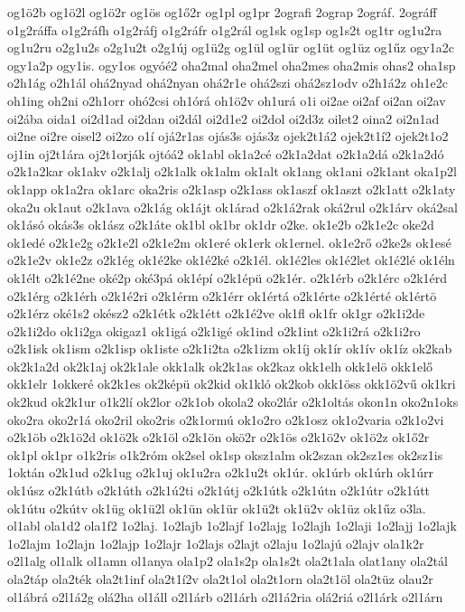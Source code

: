 {og1ö2b
og1ö2l
og1ö2r
og1ös
og1ő2r
og1pl
og1pr
2ografi
2ograp
2ográf.
2ográff
o1g2ráffa
o1g2ráfh
o1g2ráfj
o1g2ráfr
o1g2rál
og1sk
og1sp
og1s2t
og1tr
og1u2ra
og1u2ru
o2g1u2s
o2g1u2t
o2g1új
og1ü2g
og1ül
og1ür
og1üt
og1üz
og1űz
ogy1a2c
ogy1a2p
ogy1is.
ogy1os
ogyóé2
oha2mal
oha2mel
oha2mes
oha2mis
ohas2
oha1sp
o2h1ág
o2h1ál
ohá2nyad
ohá2nyan
ohá2r1e
ohá2szi
ohá2sz1odv
o2h1á2z
oh1e2c
oh1ing
oh2ni
o2h1orr
ohó2csi
oh1órá
oh1ö2v
oh1urá
o1i
oi2ae
oi2af
oi2an
oi2av
oi2ába
oida1
oi2d1ad
oi2dan
oi2dál
oi2d1e2
oi2dol
oi2d3z
oilet2
oina2
oi2n1ad
oi2ne
oi2re
oisel2
oi2zo
o1í
ojá2r1as
ojás3s
ojás3z
ojek2t1á2
ojek2t1í2
ojek2t1o2
oj1in
oj2t1ára
oj2t1orják
ojtóá2
ok1abl
ok1a2cé
o2k1a2dat
o2k1a2dá
o2k1a2dó
o2k1a2kar
ok1akv
o2k1alj
o2k1alk
ok1alm
ok1alt
ok1ang
ok1ani
o2k1ant
oka1p2l
ok1app
ok1a2ra
ok1arc
oka2ris
o2k1asp
o2k1ass
ok1aszf
ok1aszt
o2k1att
o2k1aty
oka2u
ok1aut
o2k1ava
o2k1ág
ok1ájt
ok1árad
o2k1á2rak
oká2rul
o2k1árv
oká2sal
ok1ásó
okás3s
ok1ász
o2k1áte
ok1bl
ok1br
ok1dr
o2ke.
ok1e2b
o2k1e2c
oke2d
ok1edé
o2k1e2g
o2k1e2l
o2k1e2m
ok1eré
ok1erk
ok1ernel.
ok1e2rő
o2ke2s
ok1esé
o2k1e2v
ok1e2z
o2k1ég
ok1é2ke
ok1é2ké
o2k1él.
ok1é2les
ok1é2let
ok1é2lé
ok1éln
ok1élt
o2k1é2ne
oké2p
oké3pá
ok1épí
o2k1épü
o2k1ér.
o2k1érb
o2k1érc
o2k1érd
o2k1érg
o2k1érh
o2k1é2ri
o2k1érm
o2k1érr
ok1értá
o2k1érte
o2k1érté
ok1értö
o2k1érz
oké1s2
okész2
o2k1étk
o2k1étt
o2k1é2ve
ok1fl
ok1fr
ok1gr
o2k1i2de
o2k1i2do
ok1i2ga
okigaz1
ok1igá
o2k1igé
ok1ind
o2k1int
o2k1i2rá
o2k1i2ro
o2k1isk
ok1ism
o2k1isp
ok1iste
o2k1i2ta
o2k1izm
ok1íj
ok1ír
ok1ív
ok1íz
ok2kab
ok2k1a2d
ok2k1aj
ok2k1ale
okk1alk
ok2k1as
ok2kaz
okk1elh
okk1elö
okk1elő
okk1elr
1okkeré
ok2k1es
ok2képü
ok2kid
ok1kló
ok2kob
okk1öss
okk1ö2vű
ok1kri
ok2kud
ok2k1ur
o1k2lí
ok2lor
o2k1ob
okola2
oko2lár
o2k1oltás
okon1n
oko2n1oks
oko2ra
oko2r1á
oko2ril
oko2ris
o2k1ormú
ok1o2ro
o2k1osz
ok1o2varia
o2k1o2vi
o2k1öb
o2k1ö2d
ok1ö2k
o2k1öl
o2k1ön
okö2r
o2k1ös
o2k1ö2v
ok1ö2z
ok1ő2r
ok1pl
ok1pr
o1k2ris
o1k2róm
ok2sel
ok1sp
oksz1alm
ok2szan
ok2sz1es
ok2sz1is
1oktán
o2k1ud
o2k1ug
o2k1uj
ok1u2ra
o2k1u2t
ok1úr.
ok1úrb
ok1úrh
ok1úrr
ok1úsz
o2k1útb
o2k1úth
o2k1ú2ti
o2k1útj
o2k1útk
o2k1útn
o2k1útr
o2k1útt
ok1útu
o2kútv
ok1üg
ok1ü2l
ok1ün
ok1ür
ok1ü2t
ok1ü2v
ok1üz
ok1űz
o3la.
ol1abl
ola1d2
ola1f2
1o2laj.
1o2lajb
1o2lajf
1o2lajg
1o2lajh
1o2laji
1o2lajj
1o2lajk
1o2lajm
1o2lajn
1o2lajp
1o2lajr
1o2lajs
o2lajt
o2laju
1o2lajú
o2lajv
ola1k2r
o2l1alg
ol1alk
ol1amn
ol1anya
ola1p2
ola1s2p
ola1s2t
ola2t1ala
olat1any
ola2tál
ola2táp
ola2ték
ola2t1inf
ola2t1í2v
ola2t1ol
ola2t1orn
ola2t1öl
ola2tüz
olau2r
ol1ábrá
o2l1á2g
olá2ha
ol1áll
o2l1árb
o2l1árh
o2l1á2ria
olá2riá
o2l1árk
o2l1árn
}
